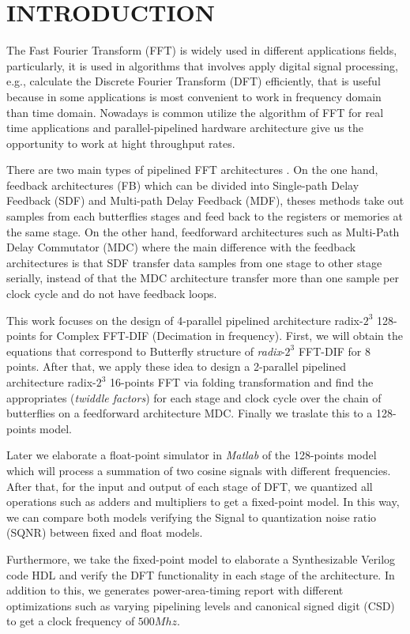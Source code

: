 \documentclass[journal,comsoc]{IEEEtran}
\begin{document}
\section{INTRODUCTION}
The Fast Fourier Transform (FFT) is widely used in different applications fields, particularly, it is used in algorithms that involves apply digital signal processing, e.g., calculate the Discrete Fourier Transform (DFT) efficiently, that is useful because in some applications is most convenient to work in frequency domain than time domain. Nowadays is common utilize the algorithm of FFT for real time applications and parallel-pipelined hardware architecture give us the opportunity to work at hight throughput rates.

There are two main types of pipelined FFT architectures \cite{shousheng_he_designing_1998}. On the one hand, feedback architectures (FB) which can be divided into Single-path Delay Feedback (SDF) and Multi-path Delay Feedback (MDF), theses methods take out samples from each butterflies stages and feed back to the registers or memories at the same stage. On the other hand, feedforward architectures such as Multi-Path Delay Commutator (MDC) where the main difference with the feedback architectures is that SDF transfer data samples from one stage to other stage serially, instead of that the MDC architecture transfer more than one sample per clock cycle and do not have feedback loops.

This work focuses on the design of 4-parallel pipelined architecture radix-$2^3$ 128-points for Complex FFT-DIF (Decimation in frequency). First, we will obtain the equations that correspond to Butterfly structure of \textit{radix}-$2^3$ FFT-DIF for 8 points. After that, we apply these idea to design a 2-parallel pipelined architecture radix-$2^3$ 16-points FFT via folding transformation and find the appropriates (\textit{twiddle factors}) for each stage and clock cycle over the chain of butterflies on a feedforward architecture MDC. Finally we traslate this to a 128-points model. 

Later we elaborate a float-point simulator in \textit{Matlab} of the 128-points model which will process a summation of two cosine signals with different frequencies. After that, for the input and output of each stage of DFT, we quantized all operations such as adders and multipliers to get a fixed-point model. In this way, we can compare both models verifying the Signal to quantization noise ratio (SQNR) between fixed and float models.

Furthermore, we take the fixed-point model to elaborate a Synthesizable Verilog code HDL and verify the DFT functionality in each stage of the architecture. In addition to this, we generates power-area-timing report with different optimizations such as varying pipelining levels and canonical signed digit (CSD) to get a clock frequency of $500Mhz$.
\end{document}
